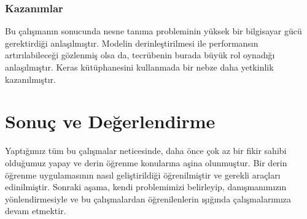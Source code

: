 \documentclass[12pt,a4paper]{article}
\begin{document}
    \subsubsection{Kazanımlar}
    Bu çalışmanın sonucunda nesne tanıma probleminin yüksek bir bilgisayar gücü gerektirdiği anlaşılmıştır.
    Modelin derinleştirilmesi ile performansın artırılabileceği gözlenmiş olsa da, tecrübenin burada büyük rol oynadığı anlaşılmıştır.
    Keras kütüphanesini kullanmada bir nebze daha yetkinlik kazanılmıştır.

    \newpage

    \section{Sonuç ve Değerlendirme}
    Yaptığımız tüm bu çalışmalar neticesinde, daha önce çok az bir fikir sahibi olduğumuz yapay ve derin öğrenme konularına aşina olunmuştur. Bir derin öğrenme uygulamasının
    nasıl geliştirildiği öğrenilmiştir ve gerekli araçları edinilmiştir. Sonraki aşama, kendi problemimizi belirleyip, danışmanımızın yönlendirmesiyle ve bu çalışmalardan öğrenilenlerin
    ışığında çalışmalarımıza devam etmektir.
\end{document}
